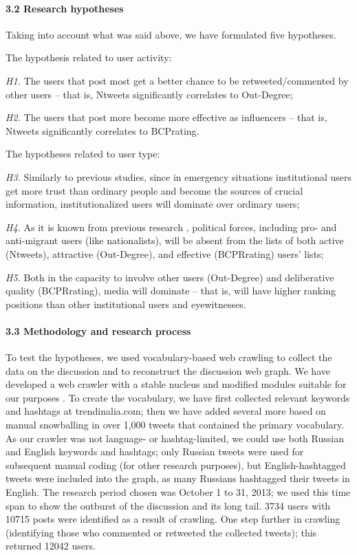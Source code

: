 \paragraph{3.2 Research hypotheses}
Taking into account what was said above, we have formulated five hypotheses.

The hypothesis related to user activity:

\textit{H1.} The users that post most get a better chance to be retweeted/commented by other users – that is, Ntweets significantly correlates to Out-Degree;

\textit{H2.} The users that post more become more effective as influencers – that is, Ntweets significantly correlates to BCPrating.

The hypotheses related to user type:

\textit{H3.} Similarly to previous studies, since in emergency situations institutional users get more trust than ordinary people and become the sources of crucial information, institutionalized users will dominate over ordinary users;

\textit{H4.} As it is known from previous research \cite{Greene,BarashKelly}, political forces, including pro- and anti-migrant users (like nationalists), will be absent from the lists of both active (Ntweets), attractive (Out-Degree), and effective (BCPRrating) users’ lists;

\textit{H5.} Both in the capacity to involve other users (Out-Degree) and deliberative quality (BCPRrating), media will dominate – that is, will have higher ranking positions than other institutional users and eyewitnesses.

\paragraph{3.3 Methodology and research process}
To test the hypotheses, we used vocabulary-based web crawling to collect the data on the discussion and to reconstruct the discussion web graph. We have developed a web crawler with a stable nucleus and modified modules suitable for our purposes \cite{BlekanovSergeevMartynenko}. To create the vocabulary, we have first collected relevant keywords and hashtags at trendinalia.com; then we have added several more based on manual snowballing in over 1,000 tweets that contained the primary vocabulary. As our crawler was not language- or hashtag-limited, we could use both Russian and English keywords and hashtags; only Russian tweets were used for subsequent manual coding (for other research purposes), but English-hashtagged tweets were included into the graph, as many Russians hashtagged their tweets in English. The research period chosen was October 1 to 31, 2013; we used this time span to show the outburst of the discussion and its long tail. 3734 users with 10715 posts were identified as a result of crawling. One step further in crawling (identifying those who commented or retweeted the collected tweets); this returned 12042 users.

